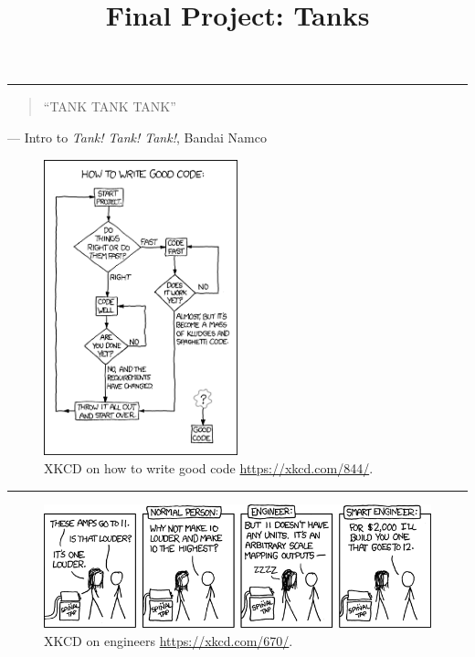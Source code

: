 \documentclass[11pt]{cselabheader}
\title{Final Project: Tanks}
\begin{document}

\maketitle
{}
\hrule

\begin{quotation}
  ``TANK TANK TANK''
\end{quotation}
\begin{flushright}
  --- Intro to \emph{Tank! Tank! Tank!}, Bandai Namco
\end{flushright}

\begin{figure}[H]
\centering
\includegraphics[width=0.5\textwidth]{img/xkcd_good_code.png}
\caption{XKCD on how to write good code \url{https://xkcd.com/844/}.}
\end{figure}

\hrule

\pagebreak
\tableofcontents

\begin{figure}[H]
\includegraphics[width=\textwidth]{img/xkcd_spinal_tap_amps.png}
\caption{XKCD on engineers \url{https://xkcd.com/670/}.}
\end{figure}
\end{document}
